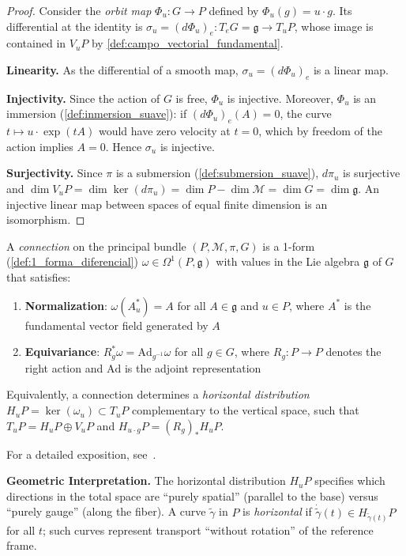 \begin{proof}
Consider the \textit{orbit map} $\Phi_u: G \to P$ defined by $\Phi_u(g) = u \cdot g$. Its differential at the identity is $\sigma_u = (d\Phi_u)_e: T_eG = \mathfrak{g} \to T_uP$, whose image is contained in $V_uP$ by \autoref{def:campo_vectorial_fundamental}.

\textbf{Linearity.} As the differential of a smooth map, $\sigma_u = (d\Phi_u)_e$ is a linear map.

\textbf{Injectivity.} Since the action of $G$ is free, $\Phi_u$ is injective. Moreover, $\Phi_u$ is an immersion (\autoref{def:inmersion_suave}): if $(d\Phi_u)_e(A) = 0$, the curve $t \mapsto u \cdot \exp(tA)$ would have zero velocity at $t = 0$, which by freedom of the action implies $A = 0$. Hence $\sigma_u$ is injective.

\textbf{Surjectivity.} Since $\pi$ is a submersion (\autoref{def:submersion_suave}), $d\pi_u$ is surjective and $\dim V_u P = \dim \ker(d\pi_u) = \dim P - \dim \mathcal{M} = \dim G = \dim \mathfrak{g}$. An injective linear map between spaces of equal finite dimension is an isomorphism.
\end{proof}

\begin{definition}\label{def:conexion_fibrado}
A \textit{connection} on the principal bundle $(P, \mathcal{M}, \pi, G)$ is a 1-form (\autoref{def:1_forma_diferencial}) $\omega \in \Omega^1(P, \mathfrak{g})$ with values in the Lie algebra $\mathfrak{g}$ of $G$ that satisfies:
\begin{enumerate}
    \item \textbf{Normalization}: $\omega(A^*_u) = A$ for all $A \in \mathfrak{g}$ and $u \in P$, where $A^*$ is the fundamental vector field generated by $A$
    \item \textbf{Equivariance}: $R_g^* \omega = \mathrm{Ad}_{g^{-1}} \omega$ for all $g \in G$, where $R_g: P \to P$ denotes the right action and $\mathrm{Ad}$ is the adjoint representation
\end{enumerate}
Equivalently, a connection determines a \textit{horizontal distribution} $H_u P = \ker(\omega_u) \subset T_u P$ complementary to the vertical space, such that $T_u P = H_u P \oplus V_u P$ and $H_{u \cdot g} P = (R_g)_* H_u P$.

For a detailed exposition, see~\citep{Taubes2011}.
\end{definition}

\textbf{Geometric Interpretation.} The horizontal distribution $H_u P$ specifies which directions in the total space are ``purely spatial'' (parallel to the base) versus ``purely gauge'' (along the fiber). A curve $\tilde{\gamma}$ in $P$ is \textit{horizontal} if $\dot{\tilde{\gamma}}(t) \in H_{\tilde{\gamma}(t)} P$ for all $t$; such curves represent transport ``without rotation'' of the reference frame.

